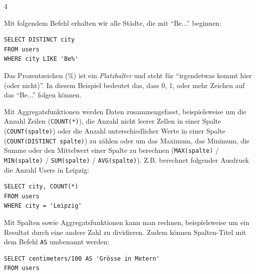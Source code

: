 \begin{landscape}
\begin{multicols*}{4}
\begin{cheatSheetBox}[title=Ungefähre Treffer: \texorpdfstring{\lstinline|LIKE|}{LIKE}]
Mit folgendem Befehl erhalten wir alle Städte, die mit \enquote{Be...} beginnen:
\begin{lstlisting}
SELECT DISTINCT city 
FROM users 
WHERE city LIKE 'Be%'
\end{lstlisting}
Das Prozentzeichen (\%) ist ein \textit{Platzhalter} und steht für \enquote{irgendetwas kommt hier (oder nicht)}. In diesem Beispiel bedeutet das, dass 0, 1, oder mehr Zeichen auf das \enquote{Be...} folgen können.
\end{cheatSheetBox}
%
\begin{cheatSheetBox}[title=Aggregatsfunktionen]
Mit Aggregatsfunktionen werden Daten zusammengefasst, beispielsweise um die Anzahl Zeilen (\lstinline|COUNT(*)|), die Anzahl nicht leerer Zellen in einer Spalte (\lstinline|COUNT(spalte)|) oder die Anzahl unterschiedlicher Werte in einer Spalte (\lstinline|COUNT(DISTINCT spalte)|) zu zählen oder um das Maximum, das Minimum, die Summe oder den Mittelwert einer Spalte zu berechnen (\lstinline|MAX(spalte)| / \lstinline|MIN(spalte)| / \lstinline|SUM(spalte)| / \lstinline|AVG(spalte)|). Z.B. berechnet folgender Ausdruck die Anzahl Users in Leipzig:
\begin{lstlisting}
SELECT city, COUNT(*)
FROM users 
WHERE city = 'Leipzig'
\end{lstlisting}
\end{cheatSheetBox}

\begin{cheatSheetBox}[title=Rechnen und umbenennen: \texorpdfstring{\lstinline|AS|}{AS}]
Mit Spalten sowie Aggregatsfunktionen kann man rechnen, beispielsweise um ein Resultat durch eine andere Zahl zu dividieren. Zudem können Spalten-Titel mit dem Befehl \lstinline|AS| umbenannt werden:
\begin{lstlisting}
SELECT centimeters/100 AS 'Grösse in Metern'
FROM users 
\end{lstlisting}
\end{cheatSheetBox}


\end{multicols*}
\end{landscape}
